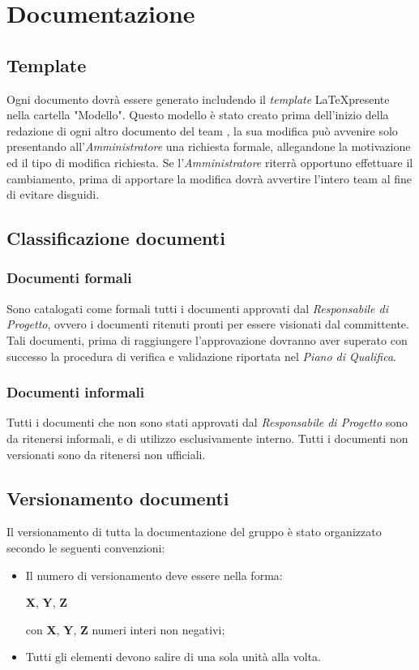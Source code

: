 \section{Documentazione}
\subsection{Template}
Ogni documento dovrà essere generato includendo il \textit{template} \LaTeX presente nella cartella "Modello".
Questo modello è stato creato prima dell'inizio della redazione di ogni altro documento del team \gruppo{}, la sua modifica può avvenire solo presentando all'\textit{Amministratore} una richiesta formale, allegandone la motivazione ed il tipo di modifica richiesta. Se l'\textit{Amministratore} riterrà opportuno effettuare il cambiamento, prima di apportare la modifica dovrà avvertire l'intero team al fine di evitare disguidi.

\subsection{Classificazione documenti}
\subsubsection{Documenti formali}
Sono catalogati come formali tutti i documenti approvati dal \textit{Responsabile di Progetto}, ovvero i documenti ritenuti pronti per essere visionati dal committente. Tali documenti, prima di raggiungere l'approvazione dovranno aver superato con successo la procedura di verifica e validazione riportata nel \textit{Piano di Qualifica}.
\subsubsection{Documenti informali}
Tutti i documenti che non sono stati approvati dal \textit{Responsabile di Progetto} sono da ritenersi informali, e di utilizzo esclusivamente interno. Tutti i documenti non versionati sono da ritenersi non ufficiali.

\subsection{Versionamento documenti}
Il versionamento di tutta la documentazione del gruppo \gruppo{} è stato organizzato secondo le seguenti convenzioni:
\begin{itemize}
\item Il numero di versionamento deve essere nella forma:

\begin{center}
\textbf{X}, \textbf{Y}, \textbf{Z}
\end{center}

con \textbf{X}, \textbf{Y}, \textbf{Z} numeri interi non negativi;
\item Tutti gli elementi devono salire di una sola unità alla volta.
\end{itemize}

